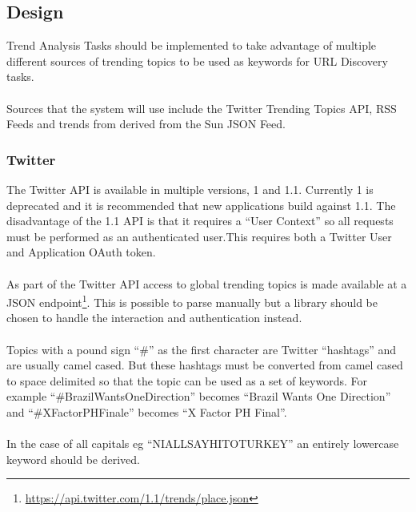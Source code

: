 \subsection{Design}
Trend Analysis Tasks should be implemented to take advantage of multiple different sources of trending topics to be used as keywords for URL Discovery tasks.

\paragraph{}
Sources that the system will use include the Twitter Trending Topics API, RSS Feeds and trends from derived from the Sun JSON Feed.

\subsubsection{Twitter}
The Twitter API is available in multiple versions, 1 and 1.1. Currently 1 is deprecated and it is recommended that new applications build against 1.1.  The disadvantage of the 1.1 API is that it requires a ``User Context'' so all requests must be performed as an authenticated user.This requires both a Twitter User and Application OAuth token.

\paragraph{}
As part of the Twitter API access to global trending topics is made available at a JSON endpoint\footnote{\url{https://api.twitter.com/1.1/trends/place.json}}. This is possible to parse manually but a library should be chosen to handle the interaction and authentication instead.

\paragraph{}
Topics with a pound sign ``\#'' as the first character are Twitter ``hashtags'' and are usually camel cased. But these hashtags must be converted from camel cased to space delimited so that the topic can be used as a set of keywords. For example ``\#BrazilWantsOneDirection'' becomes ``Brazil Wants One Direction'' and ``\#XFactorPHFinale'' becomes ``X Factor PH Final''.

\paragraph{}
In the case of all capitals eg ``NIALLSAYHITOTURKEY'' an entirely lowercase keyword should be derived.

